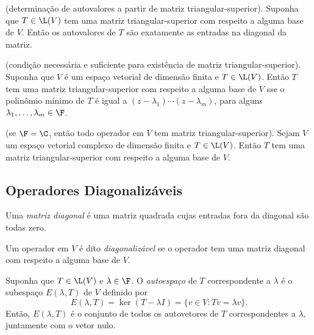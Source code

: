 \documentclass{article}
\begin{document}
\begin{prop} (determinação de autovalores a partir de matriz triangular-superior).
    Suponha que \(T \in \L(V)\) tem uma matriz triangular-superior com respeito a alguma base de \(V\). Então os autovalores de \(T\) são exatamente as entradas na diagonal da matriz.
\end{prop}

\begin{prop} (condição necessária e suficiente para existência de matriz triangular-superior).
    Suponha que \(V\) é um espaço vetorial de dimensão finita e \(T \in \L(V)\). Então \(T\) tem uma matriz triangular-superior com respeito a alguma base de \(V\) sse o polinômio mínimo de \(T\) é igual a \((z - \lambda_1) \cdots (z - \lambda_m)\), para alguns \(\lambda_1, \ldots, \lambda_m \in \F\).
\end{prop}

\begin{cor} (se \(\F=\C\), então todo operador em \(V\) tem matriz triangular-superior).
    Sejam \(V\) um espaço vetorial complexo de dimensão finita e \(T \in \L(V)\). Então \(T\) tem uma matriz triangular-superior com respeito a alguma base de \(V\).
\end{cor}

\subsection{Operadores Diagonalizáveis}

\begin{defn}
    Uma \emph{matriz diagonal} é uma matriz quadrada cujas entradas fora da diagonal são todas zero.
\end{defn}

\begin{defn}
    Um operador em \(V\) é dito \emph{diagonalizável} se o operador tem uma matriz diagonal com respeito a alguma base de \(V\).
\end{defn}

\begin{defn}
    Suponha que \(T \in \L(V)\) e \(\lambda \in \F\). O \emph{autoespaço} de \(T\) correspondente a \(\lambda\) é o subespaço \(E(\lambda, T)\) de \(V\) definido por
    \[
        E(\lambda, T) = \ker(T - \lambda I) = \{v \in V : Tv = \lambda v\}.
    \]
    \noindent Então, \(E(\lambda, T)\) é o conjunto de todos os autovetores de \(T\) correspondentes a \(\lambda\), juntamente com o vetor nulo.
\end{defn}
\end{document}
